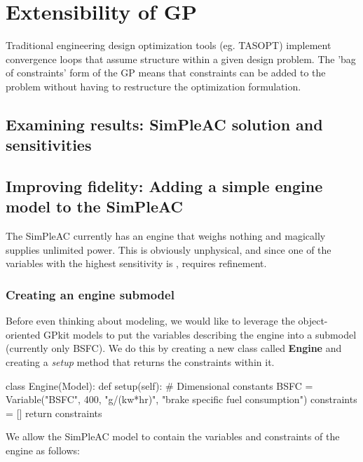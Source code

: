 \chapter{Extensibility of GP}
\label{ch3:extensibility}

Traditional engineering design optimization tools (eg. TASOPT) implement
convergence loops that assume structure within a given design problem.
The 'bag of constraints' form of the GP means that constraints can be
added to the problem without
having to restructure the optimization formulation.

\section{Examining results: SimPleAC solution and sensitivities}


\section{Improving fidelity: Adding a simple engine model to the SimPleAC}
\label{s:engine}

The SimPleAC currently has an engine that weighs nothing and magically supplies
unlimited power. This is obviously unphysical, and since one of the variables
with the highest sensitivity is \BSFC, requires refinement.

\subsection{Creating an engine submodel}

Before even thinking about modeling, we would like to leverage the object-oriented 
GPkit models to put the variables describing the engine into a submodel (currently only 
BSFC). We do this by creating a new class called \textbf{Engine} and creating a \textit{setup}
method that returns the constraints within it.

\begin{python}
class Engine(Model):
    def setup(self):
        # Dimensional constants
        BSFC      = Variable("BSFC", 400, "g/(kw*hr)", "brake specific fuel consumption")
        constraints = []
        return constraints    
\end{python}

We allow the SimPleAC model to contain the variables and constraints of the engine
as follows:


